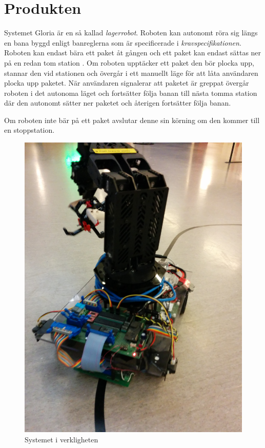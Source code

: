 
\section{Produkten}

Systemet Gloria är en så kallad \textit{lagerrobot}. Roboten kan autonomt röra sig längs en bana byggd enligt banreglerna som är specificerade i \textit{kravspecifikationen}. Roboten kan endast bära ett paket åt gången och ett paket kan endast sättas ner på en redan tom station . Om roboten upptäcker ett paket den bör plocka upp, stannar den vid stationen och övergår i ett manuellt läge för att låta användaren plocka upp paketet. När användaren signalerar att paketet är greppat övergår roboten i det autonoma läget och fortsätter följa banan till nästa tomma station där den autonomt sätter ner paketet och återigen fortsätter följa banan.

Om roboten inte bär på ett paket avslutar denne sin körning om den kommer till en stoppstation.

\begin{figure}[h!]
	\centering
	\includegraphics[scale=0.1]{grafik/produkten-gloria.jpg}
	\caption{Systemet i verkligheten} \label{produkten-gloria}
\end{figure}
